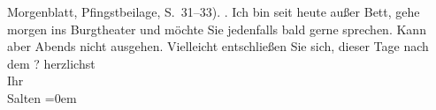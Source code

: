 \begin{ledgroupsized}[t]{13cm}
{{{                     Morgenblatt, Pfingstbeilage, S. 31–33). }}}\label{K_L03326-2h}.\pend
           \pstart
           Ich bin seit heute außer Bett, gehe morgen ins Burgtheater
               und möchte Sie jedenfalls bald gerne sprechen. Kann aber Abends nicht
               ausgehen. Vielleicht entschließen Sie sich, dieser Tage nach {\pb}dem \label{K_L03326-3v}\label{K_L03326-3h}?\pend
           \pstart
           herzlichst {\\[\baselineskip]}Ihr {\\[\baselineskip]}\spacefill\mbox{Salten}\pend
           \leftskip=0em{}
         
         \endnumbering{}\end{ledgroupsized}  \newcommand{\dateiname}{L03326}\newcommand{\titel}{Felix Salten an Arthur Schnitzler, 12. 3. 1902}\newcommand{\editorInnen}{Martin Anton Müller und Laura Untner}
      